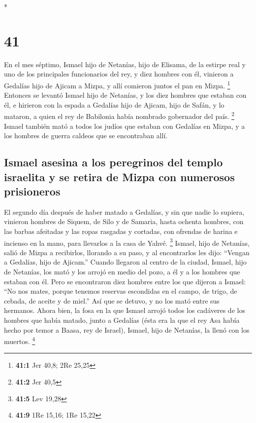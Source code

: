 \begin{paracol}{2}
\begin{otherlanguage}{english}
\end{otherlanguage}

\switchcolumn[0]*

\hypertarget{section-80}{%
\section{41}\label{section-80}}

 En el mes séptimo, Ismael hijo de Netanías, hijo de
Elisama, de la estirpe real y uno de los principales funcionarios del
rey, y diez hombres con él, vinieron a Gedalías hijo de Ajicam a Mizpa,
y allí comieron juntos el pan en Mizpa. \footnote{\textbf{41:1} Jer
  40,8; 2Re 25,25}  Entonces se levantó Ismael hijo de
Netanías, y los diez hombres que estaban con él, e hirieron con la
espada a Gedalías hijo de Ajicam, hijo de Safán, y lo mataron, a quien
el rey de Babilonia había nombrado gobernador del país. \footnote{\textbf{41:2}
  Jer 40,5}  Ismael también mató a todos los judíos que
estaban con Gedalías en Mizpa, y a los hombres de guerra caldeos que se
encontraban allí.

\hypertarget{ismael-asesina-a-los-peregrinos-del-templo-israelita-y-se-retira-de-mizpa-con-numerosos-prisioneros}{%
\subsection{Ismael asesina a los peregrinos del templo israelita y se
retira de Mizpa con numerosos
prisioneros}\label{ismael-asesina-a-los-peregrinos-del-templo-israelita-y-se-retira-de-mizpa-con-numerosos-prisioneros}}

 El segundo día después de haber matado a Gedalías, y sin
que nadie lo supiera,  vinieron hombres de Siquem, de Silo
y de Samaria, hasta ochenta hombres, con las barbas afeitadas y las
ropas rasgadas y cortadas, con ofrendas de harina e incienso en la mano,
para llevarlos a la casa de Yahvé. \footnote{\textbf{41:5} Lev 19,28}
 Ismael, hijo de Netanías, salió de Mizpa a recibirlos,
llorando a su paso, y al encontrarlos les dijo: ``Vengan a Gedalías,
hijo de Ajicam.''  Cuando llegaron al centro de la ciudad,
Ismael, hijo de Netanías, los mató y los arrojó en medio del pozo, a él
y a los hombres que estaban con él.  Pero se encontraron
diez hombres entre los que dijeron a Ismael: ``No nos mates, porque
tenemos reservas escondidas en el campo, de trigo, de cebada, de aceite
y de miel.'' Así que se detuvo, y no los mató entre sus hermanos.
 Ahora bien, la fosa en la que Ismael arrojó todos los
cadáveres de los hombres que había matado, junto a Gedalías (ésta era la
que el rey Asa había hecho por temor a Baasa, rey de Israel), Ismael,
hijo de Netanías, la llenó con los muertos. \footnote{\textbf{41:9} 1Re
  15,16; 1Re 15,22}


\end{paracol}
